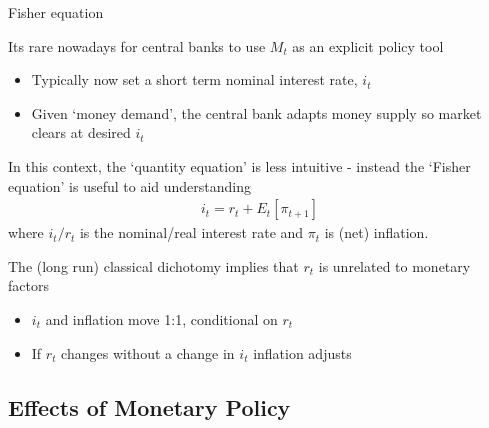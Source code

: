 \begin{frame}{Fisher equation}

Its rare nowadays for central banks to use $M_{t}$ as an explicit policy tool
\begin{itemize}
\item	Typically now set a short term nominal interest rate, $i_{t}$
\item	Given `money demand', the central bank adapts money supply so market clears at desired $i_{t}$
\end{itemize}

\vspace{2mm}
In this context, the `quantity equation' is less intuitive - instead the `Fisher equation' is useful to aid understanding
\begin{eqnarray}
i_{t} = r_{t} + E_{t}[ \pi_{t+1} ] 
\end{eqnarray}
where $i_{t}/r_{t}$ is the nominal/real interest rate and $\pi_{t}$ is (net) inflation.

\vspace{2mm}
The (long run) classical dichotomy implies that $r_{t}$ is unrelated to monetary factors
\begin{itemize}
\item	$i_{t}$ and inflation move 1:1, conditional on $r_{t}$
\item	If $r_{t}$ changes without a change in $i_{t}$ inflation adjusts
\end{itemize}

\end{frame}

\subsection{Effects of Monetary Policy}

